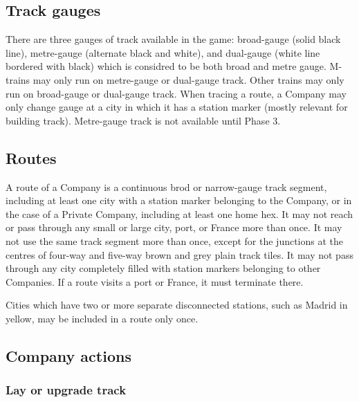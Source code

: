 \documentclass[a4paper,twocolumn]{article}
\begin{document}
\subsection{Track gauges}
There are three gauges of track available in the game: broad-gauge (solid black
line), metre-gauge (alternate black and white), and dual-gauge (white line
bordered with black) which is considred to be both broad and metre gauge.
M-trains may only run on metre-gauge or dual-gauge track. Other trains may only
run on broad-gauge or dual-gauge track. When tracing a route, a Company may only
change gauge at a city in which it has a station marker (mostly relevant for
building track). Metre-gauge track is not available until Phase 3.

\subsection{Routes}
A route of a Company is a continuous brod or narrow-gauge track segment,
including at least one city with a station marker belonging to the Company, or
in the case of a Private Company, including at least one home hex. It may not
reach or pass through any small or large city, port, or France more than once.
It may not use the same track segment more than once, except for the junctions
at the centres of four-way and five-way brown and grey plain track tiles. It may
not pass through any city completely filled with station markers belonging to
other Companies. If a route visits a port or France, it must terminate there.

Cities which have two or more separate disconnected stations, such as Madrid in
yellow, may be included in a route only once.

\subsection{Company actions}
\subsubsection{Lay or upgrade track}
\end{document}
